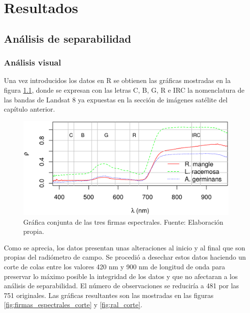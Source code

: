 


\chapter{Resultados}
\label{cap:resultados}

\section{Análisis de separabilidad}
\subsection{Análisis visual}
Una vez introducidos los datos en R se obtienen las gráficas mostradas en la figura \ref{fig:ral}, donde se expresan con las letras C, B, G, R e IRC la nomenclatura de las bandas de Landsat 8 ya expuestas en la sección de imágenes satélite del capítulo anterior.\Sep


\begin{figure}
	\centering
	\includegraphics[width=0.8\linewidth]{./Imagenes/ral2.eps}
	\caption[Firmas espectrales de las tres especies]{Gráfica conjunta de las tres firmas espectrales. Fuente: Elaboración propia.}
	\label{fig:ral}
\end{figure}

Como se aprecia, los datos presentan unas alteraciones al inicio y al final que son propias del radiómetro de campo. Se procedió a desechar estos datos haciendo un corte de colas entre los valores 420 nm y 900 nm de longitud de onda para preservar lo máximo posible la integridad de los datos y que no afectaran a los análisis de separabilidad. El número de observaciones se reduciría a 481 por las 751 originales. Las gráficas resultantes son las mostradas en las figuras \ref{fig:firmas_espectrales_corte} y \ref{fig:ral_corte}.\Sep

